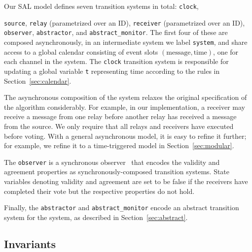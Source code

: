 \documentclass{llncs/llncs}
\begin{document}
Our SAL model defines seven transition systems in total: \texttt{clock}, {\texttt{source}, \texttt{relay} (parametrized over an ID), \texttt{receiver} (parametrized over an ID), \texttt{observer}, \texttt{abstractor}, and \texttt{abstract\_monitor}. The first four of these are composed asynchronously, in an intermediate system we label \texttt{system}, and share access to a global calendar consisting of event slots $(\text{message}, \text{time})$, one for each channel in the system. The \texttt{clock} transition system is responsible for updating a global variable \texttt{t} representing time according to the rules in Section~\ref{sec:calendar}.

The asynchronous composition of the system relaxes the original specification of the algorithm considerably. For example, in our implementation, a receiver may receive a message from one relay before another relay has received a message from the source. We only require that all relays and receivers have executed before voting. With a general asynchronous model, it is easy to refine it further; for example, we refine it to a time-triggered model in Section~\ref{sec:modular}.

The \texttt{observer} is a synchronous observer~\cite{Rushby:SAS14} that encodes the validity and agreement properties as synchronously-composed transition systems. State variables denoting validity and agreement are set to be false if the receivers have completed their vote but the respective properties do not hold.

Finally, the \texttt{abstractor} and \texttt{abstract\_monitor} encode an abstract transition system for the system, as described in Section~\ref{sec:abstract}.


\subsection{Invariants}\label{sec:invariants}

}
\end{document}
